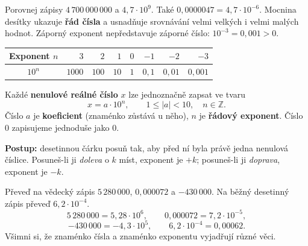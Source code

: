\documentclass[11pt,a4paper]{article}
\begin{document}

Porovnej zápisy $4\,700\,000\,000$ a $4{,}7\cdot10^9$.
Také $0{,}0000047=4{,}7\cdot10^{-6}$. Mocnina desítky
ukazuje \textbf{řád čísla} a usnadňuje srovnávání velmi velkých
i velmi malých hodnot. Záporný exponent nepředstavuje záporné číslo:
$10^{-3}=0{,}001>0$.

\begin{center}\small
\begin{tabular}{@{}c|rrrrrrr@{}}
\toprule
Exponent $n$ & $3$ & $2$ & $1$ & $0$ & $-1$ & $-2$ & $-3$\\\midrule
$10^n$ & $1000$ & $100$ & $10$ & $1$ & $0{,}1$ & $0{,}01$ & $0{,}001$\\
\bottomrule
\end{tabular}
\end{center}

\begin{definiceBox}[title={Definice: vědecký (normalizovaný exponenciální) zápis}]
Každé \textbf{nenulové reálné číslo} $x$ lze jednoznačně zapsat ve tvaru
\[
\boxed{x=a\cdot10^n,\qquad 1\le |a|<10,\quad n\in\mathbb Z.}
\]
Číslo $a$ je \textbf{koeficient} (znaménko zůstává u něho),
$n$ je \textbf{řádový exponent}. Číslo $0$ zapisujeme jednoduše jako $0$.
\end{definiceBox}
\textbf{Postup:} desetinnou čárku posuň tak, aby před ní byla právě
jedna nenulová číslice. Posuneš-li ji \emph{doleva} o $k$ míst,
exponent je $+k$; posuneš-li ji \emph{doprava}, exponent je $-k$.

\begin{prikladReseniBox}[breakable=false,title={Příklad 1: z desetinného zápisu do vědeckého a zpět}]
Převeď na vědecký zápis $5\,280\,000$,
$0{,}000072$ a $-430\,000$.
Na běžný desetinný zápis převeď $6{,}2\cdot10^{-4}$.
\tcblower
\[
5\,280\,000=\boxed{5{,}28\cdot10^6},\qquad
0{,}000072=\boxed{7{,}2\cdot10^{-5}},
\]
\[
-430\,000=\boxed{-4{,}3\cdot10^5},\qquad
6{,}2\cdot10^{-4}=\boxed{0{,}00062}.
\]
Všimni si, že znaménko čísla a znaménko exponentu vyjadřují různé věci.
\end{prikladReseniBox}
\end{document}
